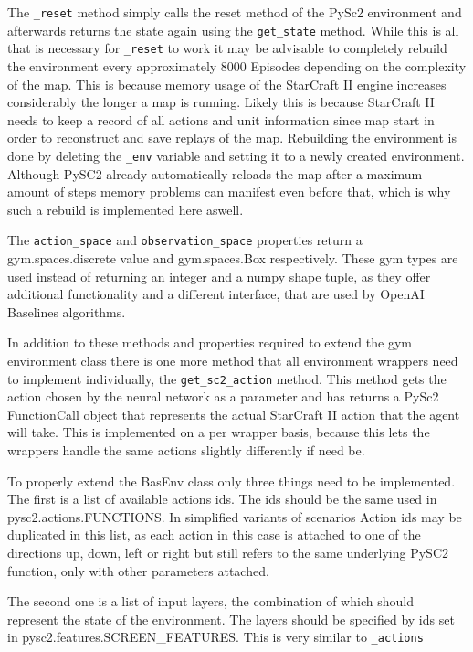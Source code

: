 The \lstinline{_reset} method simply calls the reset method of the PySc2 environment and afterwards returns the state again using the \lstinline{get_state} method. While this is all that is necessary for \lstinline{_reset} to work it may be advisable to completely rebuild the environment every approximately 8000 Episodes depending on the complexity of the map. This is because memory usage of the StarCraft II engine increases considerably the longer a map is running. Likely this is because StarCraft II needs to keep a record of all actions and unit information since map start in order to reconstruct and save replays of the map. Rebuilding the environment is done by deleting the \lstinline{_env} variable and setting it to a newly created environment. Although PySC2 already automatically reloads the map after a maximum amount of steps memory problems can manifest even before that, which is why such a rebuild is implemented here aswell.

The \lstinline{action_space} and \lstinline{observation_space} properties return a gym.spaces.discrete value and gym.spaces.Box respectively. These gym types are used instead of returning an integer and a numpy shape tuple, as they offer additional functionality and a different interface, that are used by OpenAI Baselines algorithms.

In addition to these methods and properties required to extend the gym environment class there is one more method that all environment wrappers need to implement individually, the \lstinline{get_sc2_action} method. This method gets the action chosen by the neural network as a parameter and has returns a PySc2 FunctionCall object that represents the actual StarCraft II action that the agent will take. This is implemented on a per wrapper basis, because this lets the wrappers handle the same actions slightly differently if need be.

To properly extend the BasEnv class only three things need to be implemented.
The first is a list of available actions ids. The ids should be the same used in \\pysc2.actions.FUNCTIONS. 
In simplified variants of scenarios
Action ids may be duplicated in this list, as each action in this case is attached to one of the directions up, down, left or right but still refers to the same underlying PySC2 function, only with other parameters attached.

The second one is a list of input layers, the combination of which should represent the state of the environment. The layers should be specified by ids set in pysc2.features.SCREEN\_FEATURES.
This is very similar to \lstinline{_actions}

